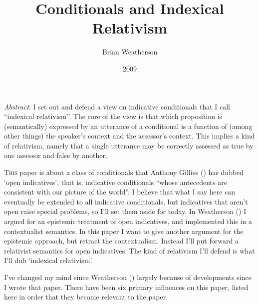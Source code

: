 \documentclass[
  11pt,
  letterpaper,
  DIV=11,
  numbers=noendperiod,
  twoside]{scrartcl}
\title{Conditionals and Indexical Relativism}
\author{Brian Weatherson}
\date{2009}
\renewenvironment{abstract}
 {\vspace{-1.25cm}
 \quotation\small\noindent\emph{Abstract}:}
 {\endquotation}
\renewenvironment{abstract}
 {\quotation\small\noindent\emph{Abstract}:}
 {\endquotation\vspace{-0.02cm}}
\begin{document}
\maketitle
\begin{abstract}
I set out and defend a view on indicative conditionals that I call
``indexical relativism''. The core of the view is that which proposition
is (semantically) expressed by an utterance of a conditional is a
function of (among other things) the speaker's context and the
assessor's context. This implies a kind of relativism, namely that a
single utterance may be correctly assessed as true by one assessor and
false by another.
\end{abstract}


\lettrine{T}{his} paper is about a class of conditionals that Anthony
Gillies () has dubbed `open
indicatives', that is, indicative conditionals ``whose antecedents are
consistent with our picture of the world''. I believe that what I say
here can eventually be extended to all indicative conditionals, but
indicatives that aren't open raise special problems, so I'll set them
aside for today. In Weatherson
() I argued for an epistemic
treatment of open indicatives, and implemented this in a contextualist
semantics. In this paper I want to give another argument for the
epistemic approach, but retract the contextualism. Instead I'll put
forward a relativist semantics for open indicatives. The kind of
relativism I'll defend is what I'll dub `indexical relativism'.

I've changed my mind since Weatherson
() largely because of
developments since I wrote that paper. There have been six primary
influences on this paper, listed here in order that they become relevant
to the paper.
\end{document}
